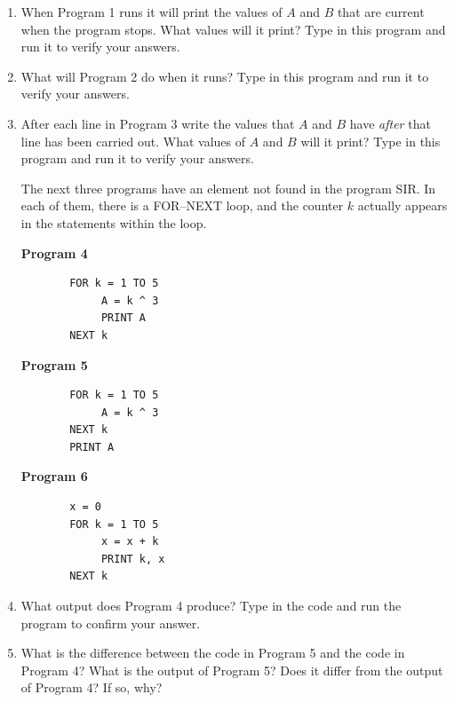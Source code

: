 \begin{enumerate}
\item When Program 1 runs it will print the values of $A$ and $B$ that
are current when the program stops.  What values will it print?  Type
in this program and run it to verify your answers.


\item What will Program 2 do when it runs? Type in this program and run
it to verify your answers.


\item After each line in Program 3 write the values that $A$ and $B$
have {\em after\/} that line has been carried out.  What values of $A$
and $B$ will it print?  Type in this program and run it to verify your
answers.



The next three programs have an element not found in the program SIR.
In each of them, there is a FOR--NEXT loop, and the counter $k$
actually appears in the statements within the loop.

\begin{center}
\begin{description}
\item[\textbf{Program 4}]

\begin{verbatim}
  FOR k = 1 TO 5
       A = k ^ 3
       PRINT A
  NEXT k
\end{verbatim}

\item[\textbf{Program 5}]

\begin{verbatim}
  FOR k = 1 TO 5
       A = k ^ 3
  NEXT k
  PRINT A
\end{verbatim}

\item[\textbf{Program 6}]

\begin{verbatim}
  x = 0
  FOR k = 1 TO 5
       x = x + k
       PRINT k, x
  NEXT k
\end{verbatim}

\end{description}
\end{center}


\item What output does Program 4 produce?  Type in the code and run the
program to confirm your answer.


\item What is the difference between the code in Program 5 and the code
in Program 4?  What is the output of Program 5?  Does it differ from
the output of Program 4?  If so, why?



\end{enumerate}
